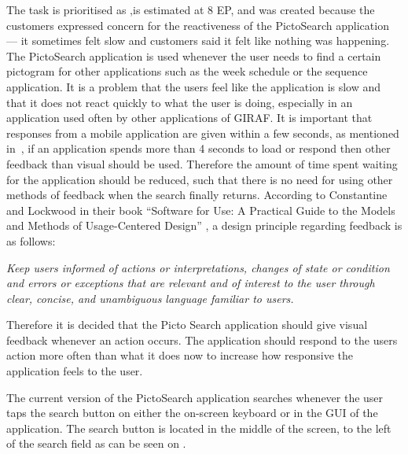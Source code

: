 
The task is prioritised as \phigh,is estimated at 8 EP, and was created because the customers expressed concern for the reactiveness of the PictoSearch application --- it sometimes felt slow and customers said it felt like nothing was happening.
The PictoSearch application is used whenever the user needs to find a certain pictogram for other applications such as the week schedule or the sequence application.
It is a problem that the users feel like the application is slow and that it does not react quickly to what the user is doing, especially in an application used often by other applications of GIRAF.
It is important that responses from a mobile application are given within a few seconds, as mentioned in~\cite{Roto:2005:NNF:1062745.1062747}, if an application spends more than 4 seconds to load or respond then other feedback than visual should be used.
Therefore the amount of time spent waiting for the application should be reduced, such that there is no need for using other methods of feedback when the search finally returns.
According to Constantine and Lockwood in their book \enquote{Software for Use: A Practical Guide to the Models and Methods of Usage-Centered Design} \cite{DESIGNBOOK}, a design principle regarding feedback is as follows:

\begin{displayquote}
\textit{Keep users informed of actions or interpretations, changes of state or condition and errors or exceptions that are relevant and of interest to the user through clear, concise, and unambiguous language familiar to users\cite[p.~57]{DESIGNBOOK}.}
\end{displayquote}

Therefore it is decided that the Picto Search application should give visual feedback whenever an action occurs.
The application should respond to the users action more often than what it does now to increase how responsive the application feels to the user.

The current version of the PictoSearch application searches whenever the user taps the search button on either the on-screen keyboard or in the GUI of the application.
The search button is located in the middle of the screen, to the left of the search field as can be seen on .

